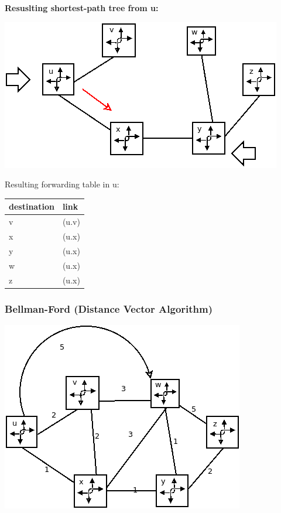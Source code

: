 \documentclass[11pt]{article}
\begin{document}
\textbf{Resuslting shortest-path tree from u:}
\begin{center}
\includegraphics[width=.9\linewidth]{../img/resultShortPath.png}
\end{center}

Resulting forwarding table in u:

\begin{center}
\begin{tabular}{ll}
destination & link\\
\hline
v & (u.v)\\
x & (u.x)\\
y & (u.x)\\
w & (u.x)\\
z & (u.x)\\
\end{tabular}
\end{center}


\subsubsection{Bellman-Ford (Distance Vector Algorithm)}
\label{sec:org30f01de}

\begin{center}
\includegraphics[width=.9\linewidth]{../img/graphAbstraction.png}
\end{center}
\end{document}

